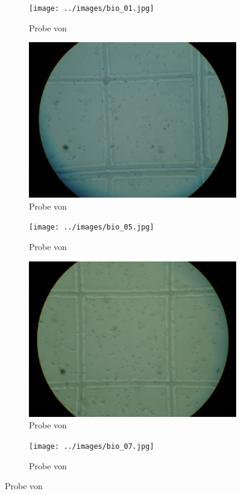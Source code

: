 \begin{figure}[h!]
	\centering
	\begin{subfigure}[b]{0.45\textwidth}
		\texttt{[image: ../images/bio\_01.jpg]}
		\caption{Probe von \matA}
	\end{subfigure}
	\begin{subfigure}[b]{0.45\textwidth}
		\includegraphics[width=1\textwidth]{../images/bio_04.jpg}
		\caption{Probe von \matB}
	\end{subfigure}

	\begin{subfigure}[b]{0.45\textwidth}
		\texttt{[image: ../images/bio\_05.jpg]}
		\caption{Probe von \matC}
	\end{subfigure}
	\begin{subfigure}[b]{0.45\textwidth}
		\includegraphics[width=1\textwidth]{../images/bio_06.jpg}
		\caption{Probe von \matD}
	\end{subfigure}

	\begin{subfigure}[b]{0.45\textwidth}
		\texttt{[image: ../images/bio\_07.jpg]}
		\caption{Probe von \matE}
	\end{subfigure}
\end{figure}

